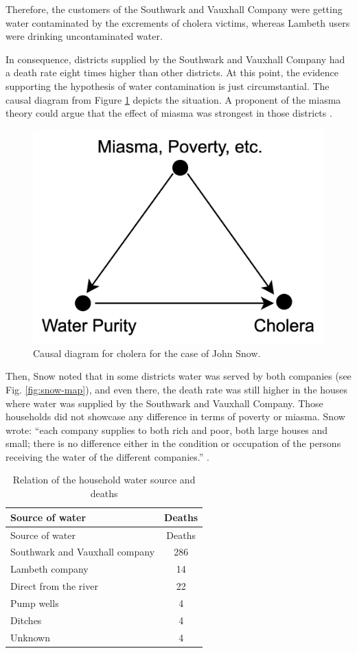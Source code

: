 \documentclass[
]{book}
\begin{document}
Therefore, the customers of the Southwark and Vauxhall Company were getting water contaminated by the excrements of cholera victims, whereas Lambeth users were drinking uncontaminated water.

In consequence, districts supplied by the Southwark and Vauxhall Company had a death rate eight times higher than other districts. At this point, the evidence supporting the hypothesis of water contamination is just circumstantial. The causal diagram from Figure \ref{fig:snow-dia-A} depicts the situation. A proponent of the miasma theory could argue that the effect of miasma was strongest in those districts \citep{book-of-why}.

\begin{figure}

{\centering \includegraphics[width=0.33\linewidth]{Figures/SnowDiagramA} 

}

\caption{Causal diagram for cholera for the case of John Snow.}\label{fig:snow-dia-A}
\end{figure}

Then, Snow noted that in some districts water was served by both companies (see Fig. \ref{fig:snow-map}), and even there, the death rate was still higher in the houses where water was supplied by the Southwark and Vauxhall Company. Those households did not showcase any difference in terms of poverty or miasma. Snow wrote: ``each company supplies to both rich and poor, both large houses and small; there is no difference either in the condition or occupation of the persons receiving the water of the different companies.'' \citep{book-of-why}.

\begin{longtable}[]{@{}lc@{}}
\caption{Relation of the household water source and deaths}\tabularnewline
\toprule
Source of water & Deaths \\
\midrule
\endfirsthead
\toprule
Source of water & Deaths \\
\midrule
\endhead
Southwark and Vauxhall company & 286 \\
Lambeth company & 14 \\
Direct from the river & 22 \\
Pump wells & 4 \\
Ditches & 4 \\
Unknown & 4 \\
\bottomrule
\end{longtable}
\end{document}
